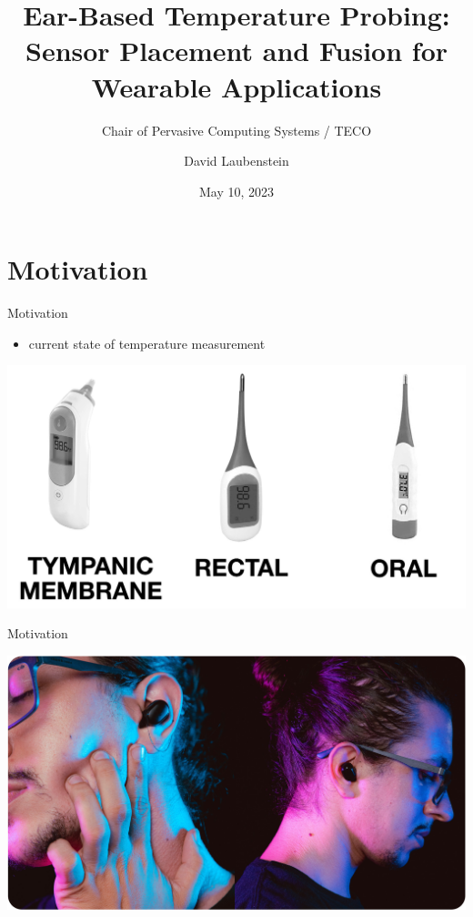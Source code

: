 \documentclass[en]{sdqbeamer}
\title[Ear-Based Temperature Probing]{Ear-Based Temperature Probing: \\ Sensor Placement and Fusion for Wearable Applications}
\subtitle{Chair of Pervasive Computing Systems / TECO}
\author[David Laubenstein]{David Laubenstein}
\date[05/10/2023]{May 10, 2023}
\begin{document}
 
\KITtitleframe


\section{Motivation}
\begin{frame}{Motivation}
    \begin{itemize}
        \item current state of temperature measurement
    \end{itemize}
    \begin{center}
        \includegraphics[scale=0.17]{proposal-presentation/images/thermometer_types.jpg}    
    \end{center}
\end{frame}

\begin{frame}{Motivation}
    \begin{center}
        \includegraphics[scale=0.16]{proposal-presentation/images/inears/earbuds_picture.jpg}
    \end{center}
\end{frame}
\end{document}
